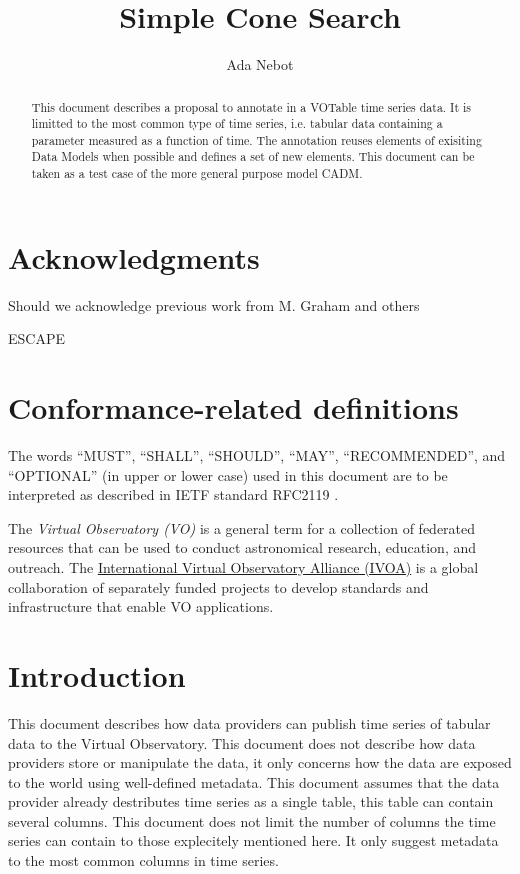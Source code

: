 \documentclass[11pt,a4paper]{ivoa}
\title{Simple Cone Search}
\author[http://www.ivoa.net/twiki/bin/view/IVOA/AdaNebot]{Ada Nebot}
\begin{document}
\begin{abstract}
  This document describes a proposal to annotate in a VOTable time series data. It is limitted to the most common type of time series, i.e. tabular data containing a parameter measured as a function of time. The annotation reuses elements of exisiting Data Models when possible and defines a set of new elements. This document can be taken as a test case of the more general purpose model CADM. 
\end{abstract}

\section*{Acknowledgments}
Should we acknowledge previous work from M. Graham and others


ESCAPE

\section*{Conformance-related definitions}

The words ``MUST'', ``SHALL'', ``SHOULD'', ``MAY'', ``RECOMMENDED'', and
``OPTIONAL'' (in upper or lower case) used in this document are to be
interpreted as described in IETF standard RFC2119 \citep{std:RFC2119}.

The \emph{Virtual Observatory (VO)} is a
general term for a collection of federated resources that can be used
to conduct astronomical research, education, and outreach.
The \href{http://www.ivoa.net}{International
Virtual Observatory Alliance (IVOA)} is a global
collaboration of separately funded projects to develop standards and
infrastructure that enable VO applications.


\section{Introduction}
This document describes how data providers can publish time series of tabular data to the Virtual Observatory. This document does not describe how data providers store or manipulate the data, it only concerns how the data are exposed to the world using well-defined metadata. This document assumes that the data provider already destributes time series as a single table, this table can contain several columns. This document does not limit the number of columns the time series can contain to those explecitely mentioned here. It only suggest metadata to the most common columns in time series.  
\end{document}
